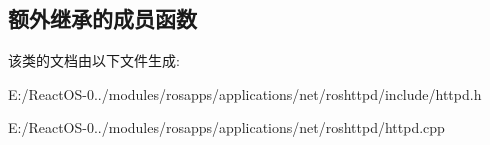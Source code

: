 \subsection*{额外继承的成员函数}


该类的文档由以下文件生成\+:\begin{DoxyCompactItemize}
\item 
E\+:/\+React\+O\+S-\/0../modules/rosapps/applications/net/roshttpd/include/httpd.\+h\item 
E\+:/\+React\+O\+S-\/0../modules/rosapps/applications/net/roshttpd/httpd.\+cpp\end{DoxyCompactItemize}
